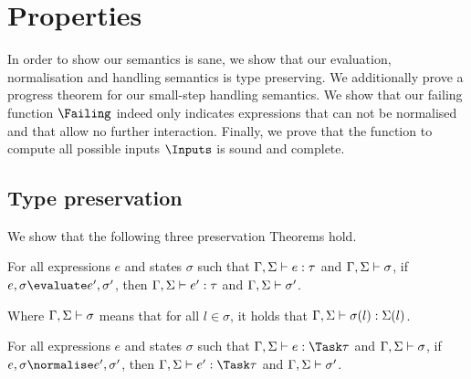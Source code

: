 


\section{Properties}
\label{sec:properties}




In order to show our semantics is sane, we show that our evaluation, normalisation
and handling semantics is type preserving. We additionally prove a progress
theorem for our small-step handling semantics.
We show that our failing function $\Failing$ indeed only indicates expressions
that can not be normalised and that allow no further interaction.
Finally, we prove that the function to compute all possible inputs $\Inputs$ is sound and complete.


\subsection{Type preservation}
\label{sub:preservation}

We show that the following three preservation Theorems hold.

\begin{theorem}
  For all expressions $e$ and states $\sigma$
  such that $\Gamma,\Sigma \vdash e:\tau$ and $\Gamma,\Sigma \vdash \sigma$,
  if $e,\sigma \evaluate e',\sigma'$,
  then $\Gamma,\Sigma \vdash e':\tau$ and $\Gamma,\Sigma \vdash \sigma'$.
  \label{thm:pres-eval}
\end{theorem}

\noindent
Where $\Gamma,\Sigma \vdash \sigma$ means that for all $l\in \sigma$, it holds that
$\Gamma,\Sigma\vdash \sigma(l):\Sigma(l)$.


\begin{theorem}
  For all expressions $e$ and states $\sigma$
  such that $\Gamma,\Sigma \infers e:\Task\tau$ and $\Gamma,\Sigma \vdash \sigma$,
  if $e,\sigma \normalise e',\sigma'$,
  then $\Gamma,\Sigma \infers e':\Task\tau$ and $\Gamma,\Sigma \vdash \sigma'$.
  \label{thm:pres-norm}
\end{theorem}

